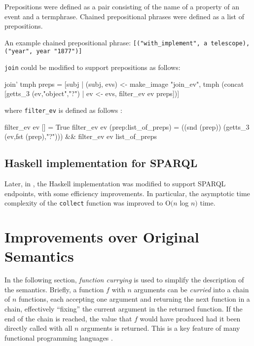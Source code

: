 \documentclass[../main.tex]{subfiles}
\begin{document}
Prepositions were defined as a pair consisting of the name of a property
of an event and a termphrase.  Chained prepositional phrases were defined
as a list of prepositions.

An example chained prepositional phrase: \texttt{[("with\_implement", a
telescope), ("year", year "1877")]}

\texttt{join} could be modified to support prepositions as
follows:

\begin{code}
  join’ tmph preps = [subj | (subj, evs) <- make_image "join_ev", 
    tmph (concat [getts_3 (ev,"object","?") | ev <- evs,
      filter_ev ev preps])]
\end{code}

where \texttt{filter\_ev} is defined as follows \cite{frost2014denotational}:

\begin{code}
  filter_ev ev [] = True
  filter_ev ev (prep:list_of_preps) = ((snd (prep)) (getts_3 (ev,fst (prep),"?")))
                                      && filter_ev ev list_of_preps
\end{code}

\subsection{Haskell implementation for SPARQL}

Later, in \cite{agboola2015extensible}, the Haskell implementation was modified
to support SPARQL endpoints, with some efficiency improvements.  In particular, the asymptotic time complexity of the \texttt{collect} function was improved to O$(n$ log $n)$ time.

\section{Improvements over Original Semantics}

In the following section, {\em function currying} \cite{currying} is used to simplify the description of the semantics.
Briefly, a function $f$ with $n$ arguments can be {\em curried} into a chain of $n$ functions, each accepting one argument and returning the next function
in a chain, effectively ``fixing'' the current argument in the returned function.  If the end of the chain is reached, the value that $f$
would have produced had it been directly called with all $n$ arguments is returned.  This is a key feature of many functional programming languages \cite{haskell}.
\end{document}
